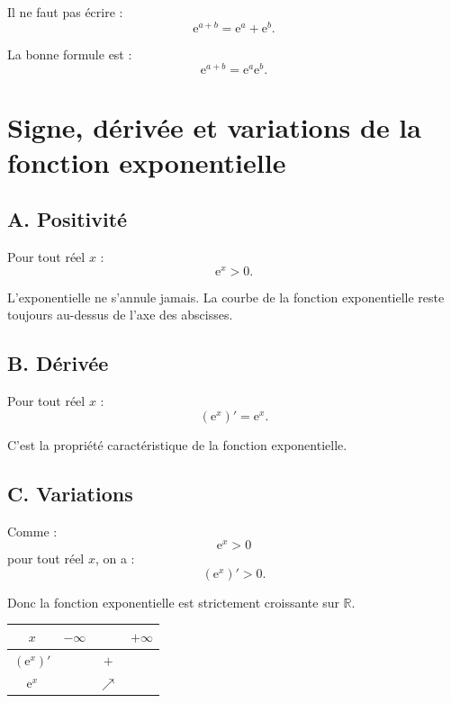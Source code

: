 \documentclass[11pt,a4paper]{article}
\newcommand{\R}{\mathbb{R}}
\newcommand{\e}{\mathrm{e}}
\begin{document}
\begin{erreur}
Il ne faut pas écrire :
\[
\e^{a+b}=\e^a+\e^b.
\]

La bonne formule est :
\[
\e^{a+b}=\e^a\e^b.
\]
\end{erreur}

\section{Signe, dérivée et variations de la fonction exponentielle}

\subsection*{A. Positivité}

\begin{theoremebox}
Pour tout réel $x$ :
\[
\e^x>0.
\]
\end{theoremebox}

\begin{remarque}
L'exponentielle ne s'annule jamais. La courbe de la fonction exponentielle reste toujours au-dessus de l'axe des abscisses.
\end{remarque}

\subsection*{B. Dérivée}

\begin{theoremebox}
Pour tout réel $x$ :
\[
(\e^x)'=\e^x.
\]
\end{theoremebox}

C'est la propriété caractéristique de la fonction exponentielle.

\subsection*{C. Variations}

Comme :
\[
\e^x>0
\]
pour tout réel $x$, on a :
\[
(\e^x)'>0.
\]

Donc la fonction exponentielle est strictement croissante sur $\R$.

\begin{center}
\begin{tabular}{c|ccc}
$x$ & $-\infty$ & & $+\infty$\\
\hline
$(\e^x)'$ & & $+$ & \\
\hline
$\e^x$ & & $\nearrow$ &
\end{tabular}
\end{center}
\end{document}
